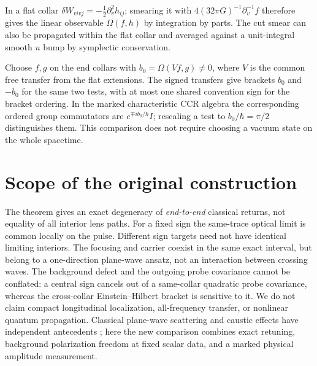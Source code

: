 \documentclass[11pt]{article}
\begin{document}
In a flat collar \(\delta W_{vivj}=-\tfrac12\partial_v^2h_{ij}\); smearing it with \(4(32\pi G)^{-1}\partial_v^{-1}f\) therefore gives the linear observable \(\Omega(f,h)\) by integration by parts. The cut smear can also be propagated within the flat collar and averaged against a unit-integral smooth \(u\) bump by symplectic conservation. 

Choose \(f,g\) on the end collars with \(b_0=\Omega(Vf,g)\ne0\), where \(V\) is the common free transfer from the flat extensions. The signed transfers give brackets \(b_0\) and \(-b_0\) for the same two tests, with at most one shared convention sign for the bracket ordering. In the marked characteristic CCR algebra the corresponding ordered group commutators are \(e^{\mp ib_0/\hbar}I\); rescaling a test to \(b_0/\hbar=\pi/2\) distinguishes them. This comparison does not require choosing a vacuum state on the whole spacetime.

\section{Scope of the original construction}\label{sec:oldscope}
The theorem gives an exact degeneracy of \emph{end-to-end} classical returns, not equality of all interior lens paths. For a fixed sign the same-trace optical limit is common locally on the pulse. Different sign targets need not have identical limiting interiors. The focusing and carrier coexist in the same exact interval, but belong to a one-direction plane-wave ansatz, not an interaction between crossing waves. The background defect and the outgoing probe covariance cannot be conflated: a central sign cancels out of a same-collar quadratic probe covariance, whereas the cross-collar Einstein--Hilbert bracket is sensitive to it. We do not claim compact longitudinal localization, all-frequency transfer, or nonlinear quantum propagation. Classical plane-wave scattering and caustic effects have independent antecedents \cite{adamo,harte}; here the new comparison combines exact retuning, background polarization freedom at fixed scalar data, and a marked physical amplitude measurement.
\end{document}

